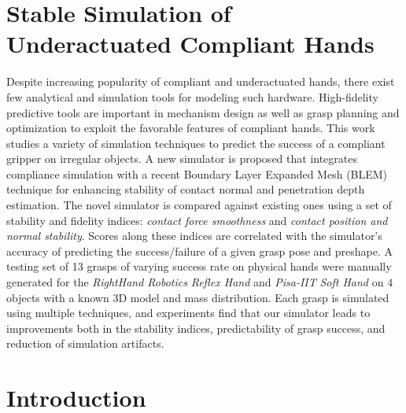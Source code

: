 \section{Stable Simulation of Underactuated Compliant Hands}

Despite increasing popularity of compliant and underactuated hands, there exist few analytical and simulation tools for modeling such hardware.  High-fidelity predictive tools are important in mechanism design as well as grasp planning and optimization to exploit the favorable features of compliant hands.
This work studies a variety of simulation techniques to predict the success of a compliant gripper on irregular objects.  A new simulator is proposed that integrates compliance simulation with a recent Boundary Layer Expanded Mesh (BLEM) technique for enhancing stability of contact normal and penetration depth estimation.
The novel simulator is compared against existing ones using a set of stability and fidelity indices: \emph{contact force smoothness} and \emph{contact position and normal stability}.
Scores along these indices are correlated with the simulator's accuracy of predicting the success/failure of a given grasp pose and preshape.  
A testing set of 13 grasps of varying success rate on physical hands were manually generated for the  \emph{RightHand Robotics} \emph{Reflex Hand} and \emph{Pisa-IIT} \emph{Soft Hand} on $4$ objects with a known 3D model and mass distribution. 
Each grasp is simulated using multiple techniques, and experiments find that our simulator leads to improvements both in the stability indices, predictability of grasp success, and reduction of simulation artifacts.



\section{Introduction}

